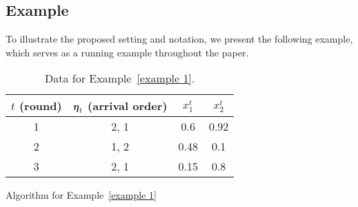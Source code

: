 \subsection{Example}
\label{sec: example}
To illustrate the proposed setting and notation, we present the following example, which serves as a running example throughout the paper.

\begin{table}[t]
\centering
\begin{tabular}{|c|c|c|c|}
\hline
$t$ (round) & $\boldsymbol{\eta}_t$ (arrival order) & $x_1^t$ & $x_2^t$ \\ \hline
1           & 2, 1                     & 0.6     & 0.92    \\ \hline
2           & 1, 2                     & 0.48    & 0.1     \\ \hline
3           & 2, 1                     & 0.15    & 0.8     \\ \hline
\end{tabular}
\caption{
    Data for Example~\ref{example 1}.
}
\label{tbl: example}
\end{table}

\begin{algorithm}[t]
\caption{Algorithm for Example~\ref{example 1}}
\label{alguni}
\DontPrintSemicolon 
{}
\end{algorithm}


